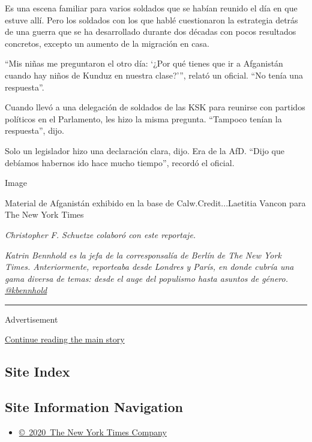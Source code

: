 Es una escena familiar para varios soldados que se habían reunido el día
en que estuve allí. Pero los soldados con los que hablé cuestionaron la
estrategia detrás de una guerra que se ha desarrollado durante dos
décadas con pocos resultados concretos, excepto un aumento de la
migración en casa.

``Mis niñas me preguntaron el otro día: `¿Por qué tienes que ir a
Afganistán cuando hay niños de Kunduz en nuestra clase?''', relató un
oficial. ``No tenía una respuesta''.

Cuando llevó a una delegación de soldados de las KSK para reunirse con
partidos políticos en el Parlamento, les hizo la misma pregunta.
``Tampoco tenían la respuesta'', dijo.

Solo un legislador hizo una declaración clara, dijo. Era de la AfD.
``Dijo que debíamos habernos ido hace mucho tiempo'', recordó el
oficial.

Image

Material de Afganistán exhibido en la base de Calw.Credit...Laetitia
Vancon para The New York Times

\emph{Christopher F. Schuetze colaboró con este reportaje.}

\emph{Katrin Bennhold es la jefa de la corresponsalía de Berlín de The
New York Times. Anteriormente, reporteaba desde Londres y París, en
donde cubría una gama diversa de temas: desde el auge del populismo
hasta asuntos de género.}
\href{https://twitter.com/kbennhold?lang=es}{\emph{@kbennhold}}

\begin{center}\rule{0.5\linewidth}{\linethickness}\end{center}

Advertisement

\protect\hyperlink{after-bottom}{Continue reading the main story}

\hypertarget{site-index}{%
\subsection{Site Index}\label{site-index}}

\hypertarget{site-information-navigation}{%
\subsection{Site Information
Navigation}\label{site-information-navigation}}

\begin{itemize}
\tightlist
\item
  \href{https://help.nytimes.com/hc/en-us/articles/115014792127-Copyright-notice}{©~2020~The
  New York Times Company}
\end{itemize}

